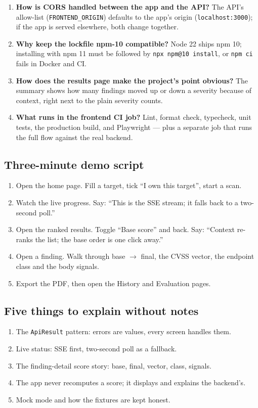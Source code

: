 \begin{enumerate}[leftmargin=*,itemsep=3pt]
exists in the browser and in tests but not on the Next.js server, so the mock's
\texttt{sse()} is registered only where it exists.
\item \textbf{How is CORS handled between the app and the API?} The API's
allow-list (\texttt{FRONTEND\_ORIGIN}) defaults to the app's origin
(\texttt{localhost:3000}); if the app is served elsewhere, both change together.
\item \textbf{Why keep the lockfile npm-10 compatible?} Node 22 ships npm 10;
installing with npm 11 must be followed by \texttt{npx npm@10 install}, or
\texttt{npm ci} fails in Docker and CI.
\item \textbf{How does the results page make the project's point obvious?} The
summary shows how many findings moved up or down a severity because of context,
right next to the plain severity counts.
\item \textbf{What runs in the frontend CI job?} Lint, format check, typecheck,
unit tests, the production build, and Playwright --- plus a separate job that runs
the full flow against the real backend.
\end{enumerate}

\subsection{Three-minute demo script}
\begin{enumerate}[leftmargin=*]
\item Open the home page. Fill a target, tick ``I own this target'', start a scan.
\item Watch the live progress. Say: ``This is the SSE stream; it falls back to a
two-second poll.''
\item Open the ranked results. Toggle ``Base score'' and back. Say: ``Context
re-ranks the list; the base order is one click away.''
\item Open a finding. Walk through base $\rightarrow$ final, the CVSS vector, the
endpoint class and the body signals.
\item Export the PDF, then open the History and Evaluation pages.
\end{enumerate}

\subsection{Five things to explain without notes}
\begin{enumerate}[leftmargin=*]
\item The \texttt{ApiResult} pattern: errors are values, every screen handles
them.
\item Live status: SSE first, two-second poll as a fallback.
\item The finding-detail score story: base, final, vector, class, signals.
\item The app never recomputes a score; it displays and explains the backend's.
\item Mock mode and how the fixtures are kept honest.
\end{enumerate}



